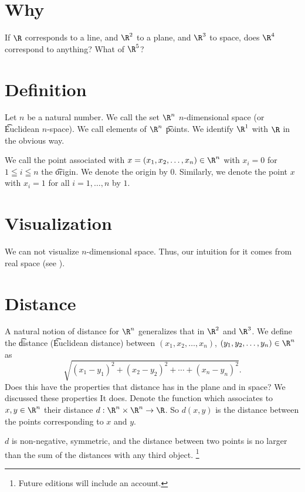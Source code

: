 
\section*{Why}

If $\R $ corresponds to a line, and $\R ^2$ to a plane, and $\R ^3$ to space, does $\R ^4$ correspond to anything? What of $\R ^5$?

\section*{Definition}

Let $n$ be a natural number.
We call the set $\R ^n$ \t{$n$-dimensional space} (or \t{Euclidean $n$-space}).
We call elements of $\R ^n$ \t{points}.
We identify $\R ^1$ with $\R $ in the obvious way.

We call the point associated with $x = (x_1, x_2, \dots , x_n) \in \R ^n$ with $x_i = 0$ for $1 \leqq i \leqq n$ the \t{origin}.
We denote the origin by $0$.
Similarly, we denote the point $x$ with $x_i = 1$ for all $i = 1, \dots , n$ by $1$.

\section*{Visualization}

We can not visualize $n$-dimensional space.
Thus, our intuition for it comes from real space (see ).

\section*{Distance}

A natural notion of distance for $\R ^n$ generalizes that in $\R ^2$ and $\R ^3$.
We define the \t{distance} (\t{Euclidean distance}) between $(x_1, x_2, \dots , x_n)$, $(y_1, y_2, \dots , y_n) \in \R ^n$ as
    \[
\sqrt{(x_1 - y_1)^2 + (x_2 - y_2)^2 + \cdots + (x_n - y_n)^2}.
    \]
Does this have the properties that distance has in the plane and in space?
We discussed these properties
It does.
Denote the function which associates to $x, y \in \R ^n$ their distance $d: \R ^n \times  \R ^n \to \R $.
So $d(x, y)$ is the distance between the points corresponding to $x$ and $y$.

\begin{proposition}
$d$ is non-negative, symmetric, and the distance between two points is no larger than the sum of the distances with any third object.
  \ifhmode\unskip\fi\footnote{
Future editions will include an account.
  }\end{proposition}
